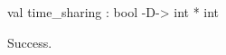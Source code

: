\chklistingtrue
{}
\begin{ChkListingMsg}
val time_sharing : bool -D-> int * int
\end{ChkListingMsg}
\begin{ChkListingErr}
Success.
\end{ChkListingErr}
